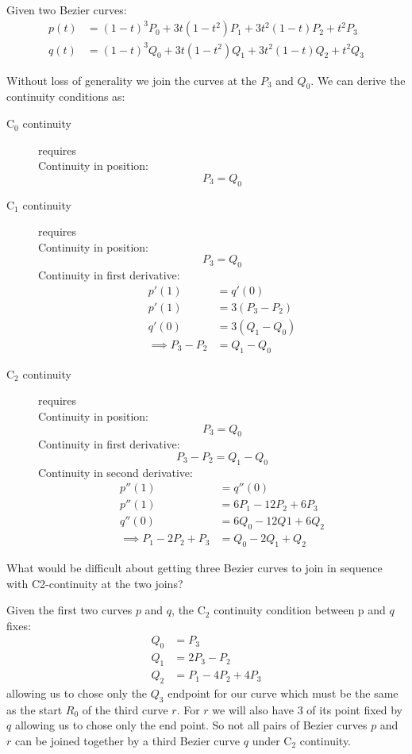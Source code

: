 \documentclass[11pt]{article}
\begin{document}
Given two Bezier curves:
\begin{align*}
	p(t) &= (1 - t)^3 P_0 + 3t(1 - t^2)P_1 + 3t^2(1 - t)P_2 + t^2 P_3 \\
	q(t) &= (1 - t)^3 Q_0 + 3t(1 - t^2)Q_1 + 3t^2(1 - t)Q_2 + t^2 Q_3
\end{align*}

Without loss of generality we join the curves at the $P_3$ and $Q_0$.
We can derive the continuity conditions as:
\begin{description}
	\item[C$_0$ continuity] requires \\
	Continuity in position:
	\[
	P_3 = Q_0 
	\]
	\item[C$_1$ continuity] requires \\
	Continuity in position: 
	\[
	P_3 = Q_0 
	\]
	Continuity in first derivative:
	\begin{align*}
		p'(1) &= q'(0) \\
		p'(1) &= 3(P_3 - P_2) \\
		q'(0) &= 3(Q_1 - Q_0) \\
		\implies P_3 - P_2 &= Q_1 - Q_0
	\end{align*}
	\item[C$_2$ continuity] requires \\
	Continuity in position: 
	\[
	P_3 = Q_0 
	\]
	Continuity in first derivative:
	\[
		P_3 - P_2 = Q_1 - Q_0
	\]
	Continuity in second derivative:
	\begin{align*}
		p''(1) &= q''(0) \\
		p''(1) &= 6P_1 - 12P_2 + 6P_3 \\
		q''(0) &= 6Q_0​­ - 12Q_​1 + 6Q_2 \\
		\implies P_1 - 2P_2 + P_3 &= Q_0 - 2Q_1 + Q_2
	\end{align*}



\end{description}

What would be difficult about getting three Bezier curves to join in sequence with C2-continuity at the two joins?

Given the first two curves $p$ and $q$, the C$_2$ continuity condition between p and $q$ fixes:
\begin{align*}
	Q_0 &= P_3 \\
	Q_1 &= 2P_3 - P_2 \\
	Q_2 &= P_1 - 4P_2 + 4P_3
\end{align*}
allowing us to chose only the $Q_3$ endpoint for our curve which must be the same as the start $R_0$ of the third curve $r$. For $r$ we will also have 3 of its point fixed by $q$ allowing us to chose only the end point. So not all pairs of Bezier curves $p$ and $r$ can be joined together by a third Bezier curve $q$ under C$_2$ continuity. 
\end{document}
